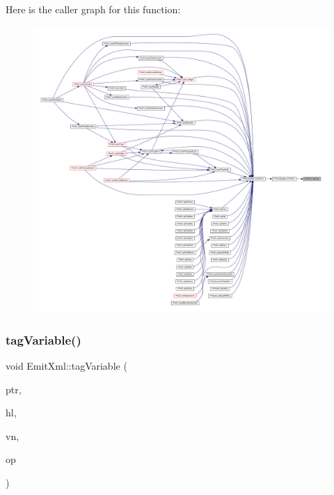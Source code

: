 Here is the caller graph for this function\+:
\nopagebreak
\begin{figure}[H]
\begin{center}
\leavevmode
\includegraphics[width=350pt]{class_emit_xml_a30a2ad299f5d55cde6ea94b2589c4dd7_icgraph}
\end{center}
\end{figure}
\mbox{\label{class_emit_xml_aeac0d9e1327c3aa1bd2e3fe42e3a1824}} 
\subsubsection{\texorpdfstring{tagVariable()}{tagVariable()}}
{\footnotesize\ttfamily void Emit\+Xml\+::tag\+Variable (\begin{DoxyParamCaption}\item[{const char $\ast$}]{ptr,  }\item[{\mbox{\hyperlink{class_emit_xml_a7c3577436da429c3c75f4b82cac6864f}{syntax\+\_\+highlight}}}]{hl,  }\item[{const \mbox{\hyperlink{class_varnode}{Varnode}} $\ast$}]{vn,  }\item[{const \mbox{\hyperlink{class_pcode_op}{Pcode\+Op}} $\ast$}]{op }\end{DoxyParamCaption})\hspace{0.3cm}{\ttfamily [virtual]}}



